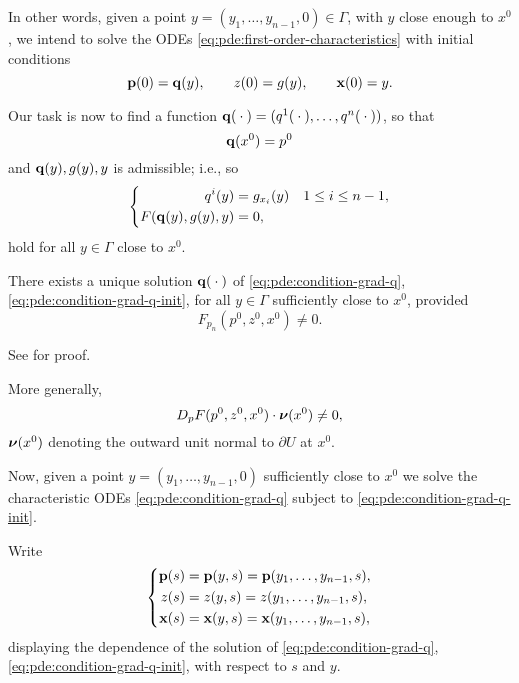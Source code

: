 In other words, given a point \(y=(y_1,\dotsc,y_{n-1},0)\in\Gamma\), with
\(y\) close enough to \(x^0\), we intend to solve the ODEs
\eqref{eq:pde:first-order-characteristics} with initial conditions
\begin{equation}
  \label{eq:pde:first-order-inits-y}
  \mathbf{p}(0)=\mathbf{q}(y),\qquad
  z(0)=g(y),\qquad
  \mathbf{x}(0)=y.
\end{equation}

Our task is now to find a function
\(\mathbf{q}({}\cdot{})=(q^1({}\cdot{}),\dotsc,q^n({}\cdot{}))\), so that
\begin{equation}
  \label{eq:pde:condition-grad-q}
  \mathbf{q}(x^0)=p^0
\end{equation}
and \(\mathbf{q}(y),g(y),y\) is admissible; i.e., so
\begin{equation}
  \label{eq:pde:condition-grad-q-init}
  \left\{
    \begin{aligned}
      q^i(y)&=g_{x_i}(y)&&1\leq i\leq n-1,\\
      F(\mathbf{q}(y),g(y),y)&=0,
    \end{aligned}
  \right.
\end{equation}
hold for all \(y\in\Gamma\) close to \(x^0\).

\begin{lemma}
  There exists a unique solution \(\mathbf{q}({}\cdot{})\) of
  \eqref{eq:pde:condition-grad-q}, \eqref{eq:pde:condition-grad-q-init},
  for all \(y\in\Gamma\) sufficiently close to \(x^0\), provided
  \[
    F_{p_n}(p^0,z^0,x^0)\neq 0.
  \]
\end{lemma}
See \cite[\S 3.2 c]{evans} for proof.

More generally,
\[
  D_pF(p^0,z^0,x^0)\cdot{\boldsymbol\nu}(x^0)\neq 0,
\]
\({\boldsymbol\nu}(x^0)\) denoting the outward unit normal to \(\partial U\) at
\(x^0\).

Now, given a point \(y=(y_1,\dotsc,y_{n-1},0)\) sufficiently close to
\(x^0\) we solve the characteristic ODEs \eqref{eq:pde:condition-grad-q}
subject to \eqref{eq:pde:condition-grad-q-init}.

Write
\[
  \left\{
    \begin{aligned}
      \mathbf{p}(s)&=\mathbf{p}(y,s)=\mathbf{p}(y_1,\dotsc,y_{n-1},s),\\
      z(s)&=z(y,s)=z(y_1,\dotsc,y_{n-1},s),\\
      \mathbf{x}(s)&=\mathbf{x}(y,s)=\mathbf{x}(y_1,\dotsc,y_{n-1},s),
    \end{aligned}
  \right.
\]
displaying the dependence of the solution of
\eqref{eq:pde:condition-grad-q}, \eqref{eq:pde:condition-grad-q-init}, with
respect to \(s\) and \(y\).

